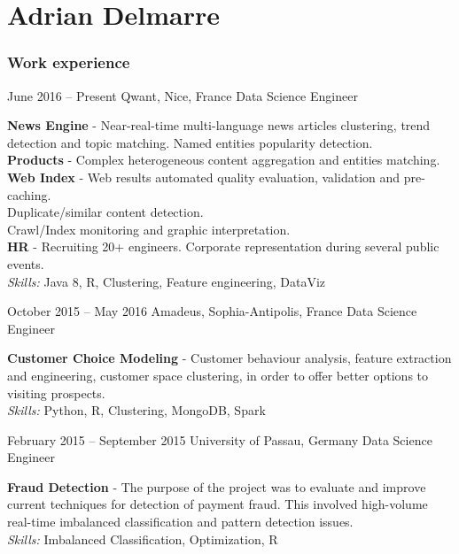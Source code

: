 \documentclass{tccv}
\renewcommand{\it}{\textit}
\renewcommand{\bf}{\textbf}
\begin{document}
\part{Adrian Delmarre}

\section{Work experience}

\begin{eventlist}

\item{June 2016 -- Present}
    {Qwant, Nice, France}
    {Data Science Engineer}

\bf{News Engine} - Near-real-time multi-language news articles clustering, trend detection and topic matching. Named entities popularity detection.\\
\bf{Products} - Complex heterogeneous content aggregation and entities matching.\\
\bf{Web Index} - Web results automated quality evaluation, validation and pre-caching.\\
Duplicate/similar content detection.\\
Crawl/Index monitoring and graphic interpretation.\\
\bf{HR} - Recruiting 20+ engineers. Corporate representation during several public events.\\
\it{Skills:} Java 8, R, Clustering, Feature engineering, DataViz

\item{October 2015 -- May 2016}
    {Amadeus, Sophia-Antipolis, France}
    {Data Science Engineer}

\bf{Customer Choice Modeling} - Customer behaviour analysis, feature extraction and engineering, customer space clustering, in order to offer better options to visiting prospects.\\
\it{Skills:} Python, R, Clustering, MongoDB, Spark

\item{February 2015 -- September 2015}
    {University of Passau, Germany}
    {Data Science Engineer}

\bf{Fraud Detection} - The purpose of the project was to evaluate and improve current techniques for detection of payment fraud. This involved high-volume real-time imbalanced classification and pattern detection issues.\\
\it{Skills:} Imbalanced Classification, Optimization, R


\end{eventlist}
\end{document}
